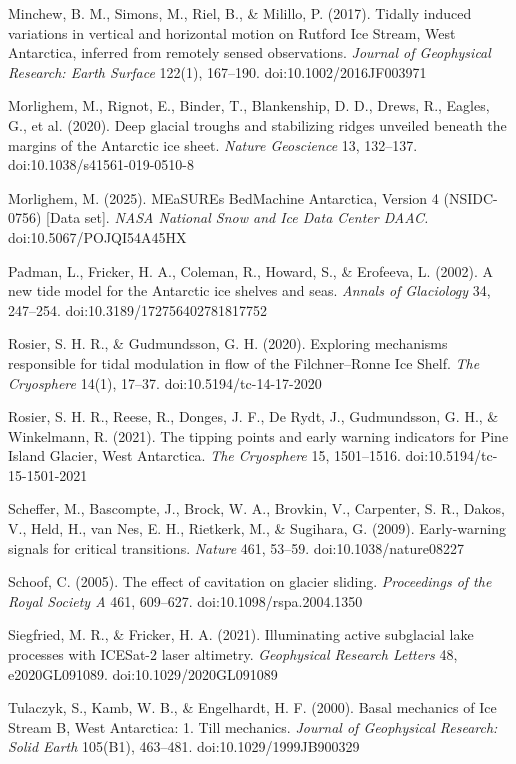 \documentclass[tc, manuscript]{copernicus}
\begin{document}
\begin{thebibliography}{}
Minchew, B. M., Simons, M., Riel, B., \& Milillo, P. (2017). Tidally induced variations in vertical and horizontal motion on Rutford Ice Stream, West Antarctica, inferred from remotely sensed observations. \emph{Journal of Geophysical Research: Earth Surface} 122(1), 167–190. doi:10.1002/2016JF003971

Morlighem, M., Rignot, E., Binder, T., Blankenship, D. D., Drews, R., Eagles, G., et al. (2020). Deep glacial troughs and stabilizing ridges unveiled beneath the margins of the Antarctic ice sheet. \emph{Nature Geoscience} 13, 132–137. doi:10.1038/s41561-019-0510-8

Morlighem, M. (2025). MEaSUREs BedMachine Antarctica, Version 4 (NSIDC-0756) [Data set]. \emph{NASA National Snow and Ice Data Center DAAC.} doi:10.5067/POJQI54A45HX

Padman, L., Fricker, H. A., Coleman, R., Howard, S., \& Erofeeva, L. (2002). A new tide model for the Antarctic ice shelves and seas. \emph{Annals of Glaciology} 34, 247–254. doi:10.3189/172756402781817752

Rosier, S. H. R., \& Gudmundsson, G. H. (2020). Exploring mechanisms responsible for tidal modulation in flow of the Filchner–Ronne Ice Shelf. \emph{The Cryosphere} 14(1), 17–37. doi:10.5194/tc-14-17-2020

Rosier, S. H. R., Reese, R., Donges, J. F., De Rydt, J., Gudmundsson, G. H., \& Winkelmann, R. (2021). The tipping points and early warning indicators for Pine Island Glacier, West Antarctica. \emph{The Cryosphere} 15, 1501–1516. doi:10.5194/tc-15-1501-2021

Scheffer, M., Bascompte, J., Brock, W. A., Brovkin, V., Carpenter, S. R., Dakos, V., Held, H., van Nes, E. H., Rietkerk, M., \& Sugihara, G. (2009). Early-warning signals for critical transitions. \emph{Nature} 461, 53–59. doi:10.1038/nature08227

Schoof, C. (2005). The effect of cavitation on glacier sliding. \emph{Proceedings of the Royal Society A} 461, 609–627. doi:10.1098/rspa.2004.1350

Siegfried, M. R., \& Fricker, H. A. (2021). Illuminating active subglacial lake processes with ICESat-2 laser altimetry. \emph{Geophysical Research Letters} 48, e2020GL091089. doi:10.1029/2020GL091089

Tulaczyk, S., Kamb, W. B., \& Engelhardt, H. F. (2000). Basal mechanics of Ice Stream B, West Antarctica: 1. Till mechanics. \emph{Journal of Geophysical Research: Solid Earth} 105(B1), 463–481. doi:10.1029/1999JB900329

\end{thebibliography}
\end{document}
